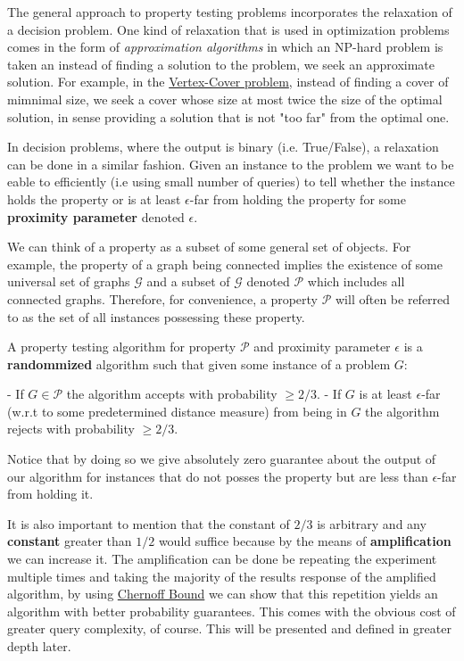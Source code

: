 The general approach to property testing problems incorporates the relaxation of a decision problem. 
One kind of relaxation that is used in optimization problems comes in the form of \emph{approximation algorithms} in which an NP-hard problem is taken an instead of finding a solution to the problem, we seek an approximate solution.
For example, in the \href{https://en.wikipedia.org/wiki/Vertex_cover}{Vertex-Cover problem}, instead of finding a cover of mimnimal size, we seek a cover whose size at most twice the size of the optimal solution, in sense providing a solution that is not "too far" from the optimal one.

In decision problems, where the output is binary (i.e. True/False), a relaxation can be done in a similar fashion. 
Given an instance to the problem we want to be eable to efficiently (i.e using small number of queries) to tell whether the instance holds the property or is at least $\epsilon$-far from holding the property for some \textbf{proximity parameter} denoted $\epsilon$.

We can think of a property as a subset of some general set of objects.
For example, the property of a graph being connected implies the existence of some universal set of graphs $\mathcal{G}$ and a subset of $\mathcal{G}$ denoted $\mathcal{P}$ which includes all connected graphs.
Therefore, for convenience, a property $\mathcal{P}$ will often be referred to as the set of all instances possessing these property.

A property testing algorithm for property $\mathcal{P}$ and proximity parameter $\epsilon$ is a \textbf{randommized} algorithm such that given some instance of a problem $G$:

- If $G \in \mathcal{P}$ the algorithm accepts with probability $\geq 2/3$.
- If $G$ is at least $\epsilon$-far (w.r.t to some predetermined distance measure) from being in $G$ the algorithm rejects with probability $\geq 2/3$.

Notice that by doing so we give absolutely zero guarantee about the output of our algorithm for instances that do not posses the property but are less than $\epsilon$-far from holding it.

It is also important to mention that the constant of $2/3$ is arbitrary and any \textbf{constant} greater than $1/2$ would suffice because by the means of \textbf{amplification} we can increase it.
The amplification can be done be repeating the experiment multiple times and taking the majority of the results response of the amplified algorithm, by using \href{https://en.wikipedia.org/wiki/Chernoff_bound}{Chernoff Bound} we can show that this repetition yields an algorithm with better probability guarantees. 
This comes with the obvious cost of greater query complexity, of course.
This will be presented and defined in greater depth later.

